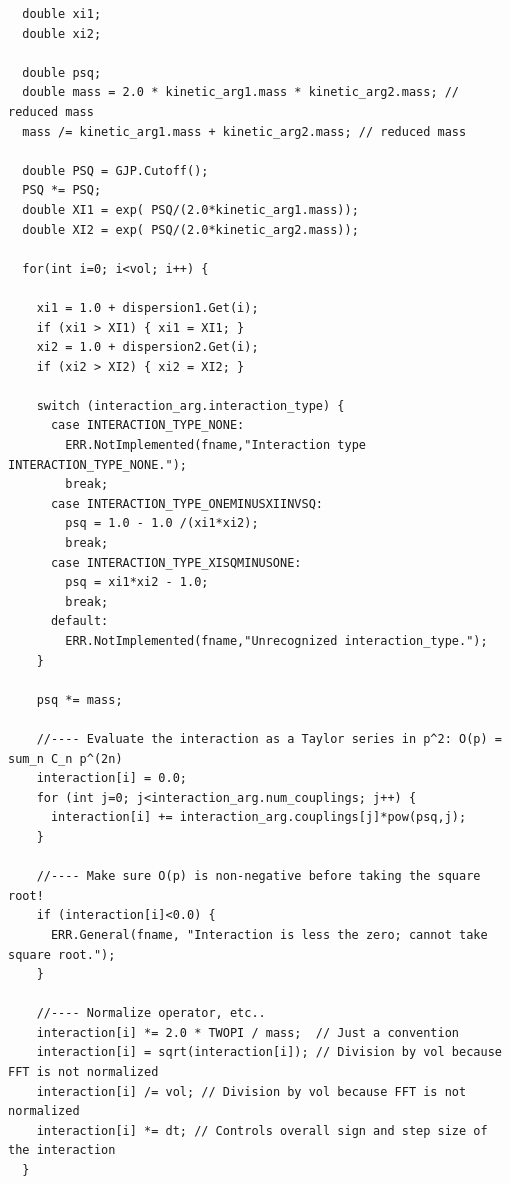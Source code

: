 \begin{lstlisting}
  double xi1;
  double xi2;

  double psq;
  double mass = 2.0 * kinetic_arg1.mass * kinetic_arg2.mass; // reduced mass
  mass /= kinetic_arg1.mass + kinetic_arg2.mass; // reduced mass

  double PSQ = GJP.Cutoff();
  PSQ *= PSQ;
  double XI1 = exp( PSQ/(2.0*kinetic_arg1.mass));
  double XI2 = exp( PSQ/(2.0*kinetic_arg2.mass));

  for(int i=0; i<vol; i++) {

    xi1 = 1.0 + dispersion1.Get(i);
    if (xi1 > XI1) { xi1 = XI1; }
    xi2 = 1.0 + dispersion2.Get(i);
    if (xi2 > XI2) { xi2 = XI2; }

    switch (interaction_arg.interaction_type) {
      case INTERACTION_TYPE_NONE:
        ERR.NotImplemented(fname,"Interaction type INTERACTION_TYPE_NONE.");
        break;
      case INTERACTION_TYPE_ONEMINUSXIINVSQ:
        psq = 1.0 - 1.0 /(xi1*xi2); 
        break;
      case INTERACTION_TYPE_XISQMINUSONE:
        psq = xi1*xi2 - 1.0; 
        break;
      default:
        ERR.NotImplemented(fname,"Unrecognized interaction_type.");
    }

    psq *= mass;

    //---- Evaluate the interaction as a Taylor series in p^2: O(p) = sum_n C_n p^(2n)
    interaction[i] = 0.0;
    for (int j=0; j<interaction_arg.num_couplings; j++) {
      interaction[i] += interaction_arg.couplings[j]*pow(psq,j);
    }

    //---- Make sure O(p) is non-negative before taking the square root!
    if (interaction[i]<0.0) {
      ERR.General(fname, "Interaction is less the zero; cannot take square root.");
    }

    //---- Normalize operator, etc..
    interaction[i] *= 2.0 * TWOPI / mass;  // Just a convention
    interaction[i] = sqrt(interaction[i]); // Division by vol because FFT is not normalized
    interaction[i] /= vol; // Division by vol because FFT is not normalized
    interaction[i] *= dt; // Controls overall sign and step size of the interaction
  }
\end{lstlisting}

